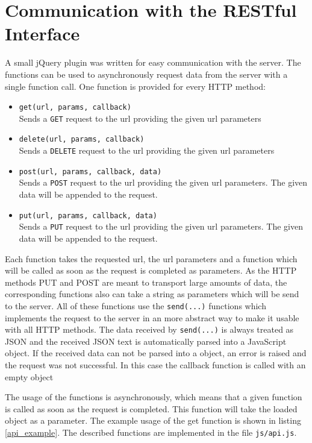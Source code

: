 \section{Communication with the RESTful Interface}
A small jQuery plugin was written for easy communication with the server. The functions can be used to asynchronously request data from the server with a single function call. One function is provided for every HTTP method:

\begin{itemize}
\item \texttt{get(url, params, callback)} \\ Sends a \texttt{GET} request to the url providing the given url parameters
\item \texttt{delete(url, params, callback)} \\ Sends a \texttt{DELETE} request to the url providing the given url parameters
\item \texttt{post(url, params, callback, data)} \\ Sends a \texttt{POST} request to the url providing the given url parameters. The given data will be appended to the request.
\item \texttt{put(url, params, callback, data)} \\ Sends a \texttt{PUT} request to the url providing the given url parameters. The given data will be appended to the request.

\end{itemize}

Each function takes the requested url, the url parameters and a function which will be called as soon as the request is completed as parameters. As the HTTP methods PUT and POST are meant to transport large amounts of data, the corresponding functions also can take a string as parameters which will be send to the server. All of these functions use the \texttt{send(...)} functions which implements the request to the server in an more abstract way to make it usable with all HTTP methods. The data received by \texttt{send(...)} is always treated as JSON and the received JSON text is automatically parsed into a JavaScript object. If the received data can not be parsed into a object, an error is raised and the request was not successful. In this case the callback function is called with an empty object 

The usage of the functions is asynchronously, which means that a given function is called as soon as the request is completed. This function will take the loaded object as a parameter. The example usage of the get function is shown in listing \ref{api_example}. The described functions are implemented in the file \texttt{js/api.js}.

